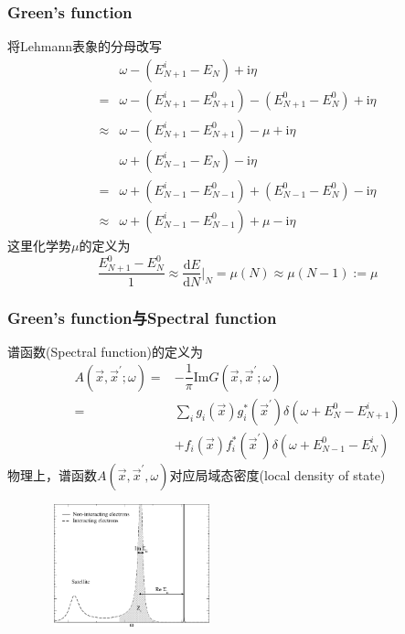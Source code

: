 \frame
{
	\frametitle{\textrm{Green's function}}
	将\textrm{Lehmann}表象的分母改写
	\begin{displaymath}
		\begin{aligned}
			&\omega-(E_{N+1}^i-E_N)+\mathrm{i}\eta\\
			=&\omega-(E_{N+1}^i-E_{N+1}^0)-(E_{N+1}^0-E_N^0)+\mathrm{i}\eta\\
			\approx&\omega-(E_{N+1}^i-E_{N+1}^0)-\mu+\mathrm{i}\eta\\
			&\omega+(E_{N-1}^i-E_N)-\mathrm{i}\eta\\
			=&\omega+(E_{N-1}^i-E_{N-1}^0)+(E_{N-1}^0-E_N^0)-\mathrm{i}\eta\\
			\approx&\omega+(E_{N-1}^i-E_{N-1}^0)+\mu-\mathrm{i}\eta
		\end{aligned}
	\end{displaymath}
	这里化学势$\mu$的定义为
	\begin{displaymath}
		\dfrac{E_{N+1}^0-E_N^0}{1}\approx\dfrac{\mathrm{d}E}{\mathrm{d}N}\bigg|_N=\mu(N)\approx\mu(N-1):=\mu
	\end{displaymath}
}

\frame
{
	\frametitle{\textrm{Green's function}与\textrm{Spectral function}}
	谱函数\textrm{(Spectral function)}的定义为
	\begin{displaymath}
		\begin{aligned}
			A(\vec x,\vec x^{\prime};\omega)=&-\dfrac1{\pi}\mathrm{Im}G(\vec x,\vec x^{\prime};\omega)\\
			=&\sum_ig_i(\vec x)g_i^{\ast}(\vec x^{\prime})\delta(\omega+E_N^0-E_{N+1}^i)\\
			&+f_i(\vec x)f_i^{\ast}(\vec x^{\prime})\delta(\omega+E_{N-1}^0-E_{N}^i)
		\end{aligned}
	\end{displaymath}
	物理上，谱函数$A(\vec x,\vec x^{\prime},\omega)$对应局域态密度\textrm{(local density of state)}
\begin{figure}[h!]
\centering
\includegraphics[height=1.4in,width=2.00in,viewport=0 0 1050 800,clip]{Figures/GW_spectral-function.png}
\label{Spectral_function}
\end{figure}
}

